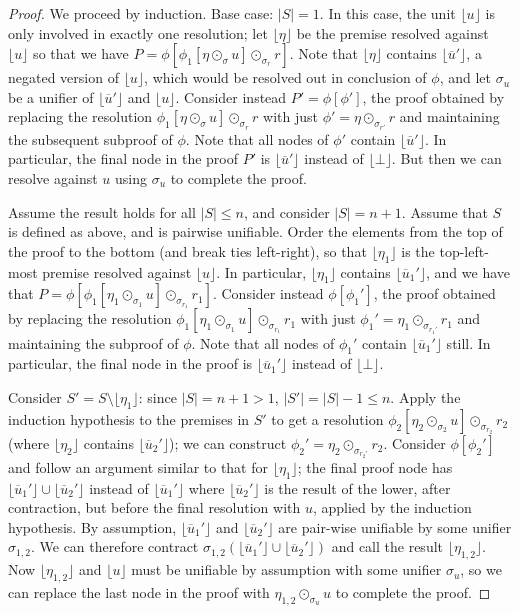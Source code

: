 \documentclass[12pt]{article}
\theoremstyle{definition}
\theoremstyle{remark}
\newcommand{\clause}[1]{ \lfloor{#1} \rfloor}
\begin{document}
\begin{proof}
We proceed by induction. Base case: $|S|=1$. In this case, the unit $\clause{u}$ is only involved in exactly one resolution; let $\clause{\eta}$ be the premise resolved against $\clause{u}$ so that we have $P=\phi[\phi_1[\eta \odot_{\sigma} u] \odot_{\sigma_r}  r]$. Note that $\clause{\eta}$ contains $\clause{\overline{u}'}$, a negated version of $\clause{u}$, which would be resolved out in conclusion of $\phi$, and let $\sigma_u$ be a unifier of $\clause{\overline{u}'}$ and $\clause{u}$. Consider instead $P'=\phi[\phi']$, the proof obtained by replacing the resolution $\phi_1[\eta \odot_{\sigma} u] \odot_{\sigma_r}  r$ with just $\phi' = \eta \odot_{\sigma_{r'}} r$ and maintaining the subsequent subproof of $\phi$. Note that all nodes of $\phi'$ contain $\clause{\overline{u}'}$. In particular, the final node in the proof $P'$ is $\clause{\overline{u}'}$ instead of $\clause{\bot}$. But then we can resolve against $u$ using $\sigma_u$ to complete the proof.

Assume the result holds for all $|S|\le n$, and consider $|S|=n+1$. Assume that $S$ is defined as above, and is pairwise unifiable. Order the elements from the top of the proof to the bottom (and break ties left-right), so that $\clause{\eta_1}$ is the top-left-most premise resolved against $\clause{u}$. In particular, $\clause{\eta_1}$ contains $\clause{\overline{u}_1'}$, and we have that $P=\phi[\phi_1[\eta_1 \odot_{\sigma_1} u] \odot_{\sigma_{r_1}} r_1]$. Consider instead $\phi[\phi_1']$, the proof obtained by replacing the resolution $\phi_1[\eta_1 \odot_{\sigma_1} u] \odot_{\sigma_{r_1}} r_1$ with just $\phi_1' = \eta_1 \odot_{\sigma_{r_1'}} r_1$ and maintaining the subproof of $\phi$. Note that all nodes of $\phi_1'$ contain $\clause{\overline{u}_1'}$ still. In particular, the final node in the proof is $\clause{\overline{u}_1'}$ instead of $\clause{\bot}$.  

Consider $S'=S\setminus\clause{\eta_1}$: since $|S|=n+1>1$, $|S'| = |S|-1 \le n$. Apply the induction hypothesis to the premises in $S'$ to get a  resolution $\phi_2[\eta_2 \odot_{\sigma_2} u] \odot_{\sigma_{r_2}} r_2$ (where $\clause{\eta_2}$ contains $\clause{\overline{u}_2'}$);  we can construct $\phi_2' = \eta_2 \odot_{\sigma_{r_2'}} r_2$. Consider  $\phi[\phi_2']$ and follow an argument similar to that for $\clause{\eta_1}$; the final proof node has $\clause{\overline{u}_1'} \cup \clause{\overline{u}_2'}$ instead of $\clause{\overline{u}_1'}$ where $\clause{\overline{u}_2'}$ is the result of the lower, after contraction, but before the final resolution with $u$, applied by the induction hypothesis.  By assumption, $\clause{\overline{u}_1'}$ and $\clause{\overline{u}_2'}$ are pair-wise unifiable by some unifier $\sigma_{1,2}$. We can therefore contract $\sigma_{1,2}(\clause{\overline{u}_1'} \cup \clause{\overline{u}_2'})$ and call the result $\clause{\eta_{1,2}}$. Now $\clause{\eta_{1,2}}$ and $\clause{u}$ must be unifiable by assumption with some unifier $\sigma_u$, so we can replace the last node in the proof with $\eta_{1,2}\odot_{\sigma_u} u$ to complete the proof.
\end{proof}
\end{document}
